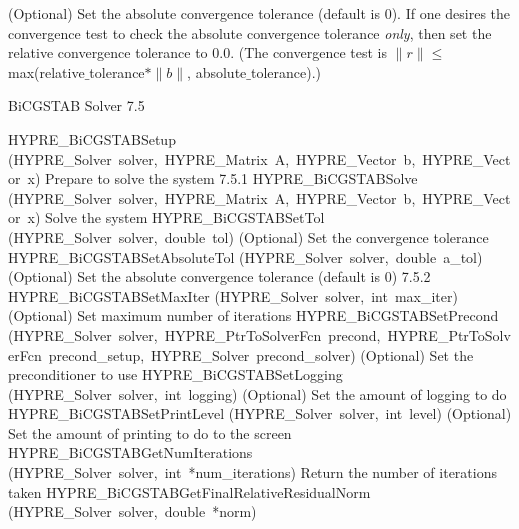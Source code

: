 \documentclass{article}
\begin{document}
\begin{cxxentry}
\begin{cxxentry}
\begin{cxxfunction}
\begin{cxxdoc}
(Optional) Set the absolute convergence tolerance (default is 0). 
If one desires
the convergence test to check the absolute convergence tolerance {\it only}, then
set the relative convergence tolerance to 0.0.  (The convergence test is 
$\|r\| \leq$ max(relative$\_$tolerance$\ast \|b\|$, absolute$\_$tolerance).)

\end{cxxdoc}
\end{cxxfunction}
\end{cxxentry}
\begin{cxxentry}
{}
        {BiCGSTAB Solver}
        {}
        {
}
        {7.5}
\begin{cxxnames}
        {HYPRE\_BiCGSTABSetup}
        {(HYPRE\_Solver\ solver,\ HYPRE\_Matrix\ A,\ HYPRE\_Vector\ b,\ HYPRE\_Vector\ x)}
        {
Prepare to solve the system}
        {7.5.1}
        {HYPRE\_BiCGSTABSolve}
        {(HYPRE\_Solver\ solver,\ HYPRE\_Matrix\ A,\ HYPRE\_Vector\ b,\ HYPRE\_Vector\ x)}
        {
Solve the system}
        {}
\label{cxx.7.5.3}
        {HYPRE\_BiCGSTABSetTol}
        {(HYPRE\_Solver\ solver,\ double\ tol)}
        {
(Optional) Set the convergence tolerance}
        {}
\label{cxx.7.5.4}
        {HYPRE\_BiCGSTABSetAbsoluteTol}
        {(HYPRE\_Solver\ solver,\ double\ a\_tol)}
        {
(Optional) Set the absolute convergence tolerance (default is 0)}
        {7.5.2}
        {HYPRE\_BiCGSTABSetMaxIter}
        {(HYPRE\_Solver\ solver,\ int\ max\_iter)}
        {
(Optional) Set maximum number of iterations}
        {}
\label{cxx.7.5.5}
        {HYPRE\_BiCGSTABSetPrecond}
        {(HYPRE\_Solver\ solver,\ HYPRE\_PtrToSolverFcn\ precond,\ HYPRE\_PtrToSolverFcn\ precond\_setup,\ HYPRE\_Solver\ precond\_solver)}
        {
(Optional) Set the preconditioner to use}
        {}
\label{cxx.7.5.6}
        {HYPRE\_BiCGSTABSetLogging}
        {(HYPRE\_Solver\ solver,\ int\ logging)}
        {
(Optional) Set the amount of logging to do}
        {}
\label{cxx.7.5.7}
        {HYPRE\_BiCGSTABSetPrintLevel}
        {(HYPRE\_Solver\ solver,\ int\ level)}
        {
(Optional) Set the amount of printing to do to the screen}
        {}
\label{cxx.7.5.8}
        {HYPRE\_BiCGSTABGetNumIterations}
        {(HYPRE\_Solver\ solver,\ int\ *num\_iterations)}
        {
Return the number of iterations taken}
        {}
\label{cxx.7.5.9}
        {HYPRE\_BiCGSTABGetFinalRelativeResidualNorm}
        {(HYPRE\_Solver\ solver,\ double\ *norm)}

\end{cxxnames}
\end{cxxentry}
\end{cxxentry}
\end{document}
